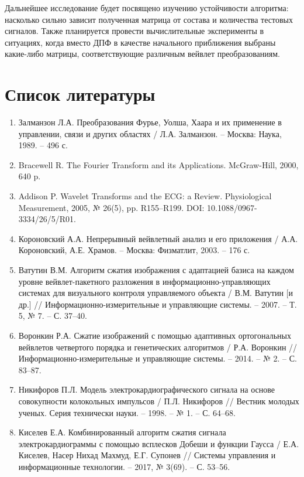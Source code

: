 \documentclass[11pt, oneside, a4paper]{article}
\begin{document}
Дальнейшее исследование будет посвящено изучению устойчивости алгоритма: насколько сильно зависит полученная матрица от состава и количества тестовых сигналов. Также планируется провести вычислительные эксперименты в ситуациях, когда вместо ДПФ в качестве начального приближения выбраны какие-либо матрицы, соответствующие различным вейвлет преобразованиям.


\section{Список литературы}

\begin{enumerate} 
\item Залманзон Л.А. Преобразования Фурье, Уолша, Хаара и их применение в управлении, связи и других областях / Л.А. Залманзон. – Москва: Наука, 1989. – 496 с.
\item Bracewell R. The Fourier Transform and its Applications. McGraw-Hill, 2000, 640 p.
\item Addison P. Wavelet Transforms and the ECG: a Review. Physiological Measurement, 2005, № 26(5), pp. R155–R199. DOI: 10.1088/0967-3334/26/5/R01.
\item Короновский А.А. Непрерывный вейвлетный анализ и его приложения / А.А. Короновский, А.Е. Храмов. – Москва: Физматлит, 2003. – 176 с.
\item Ватутин В.М. Алгоритм сжатия изображения с адаптацией базиса на каждом уровне вейвлет-пакетного разложения в информационно-управляющих системах для визуального контроля управляемого объекта / В.М. Ватутин [и др.] // Информационно-измерительные и управляющие системы. – 2007. – Т. 5, № 7. – С. 37–40.
\item Воронкин Р.А. Сжатие изображений с помощью адаптивных ортогональных вейвлетов четвертого порядка и генетических алгоритмов / Р.А. Воронкин // Информационно-измерительные и управляющие системы. – 2014. – № 2. – С. 83–87.
\item Никифоров П.Л. Модель электрокардиографического сигнала на основе совокупности колокольных импульсов / П.Л. Никифоров // Вестник молодых ученых. Серия технически науки. – 1998. – № 1. – С. 64–68.
\item Киселев Е.А. Комбинированный алгоритм сжатия сигнала электрокардиограммы с помощью всплесков Добеши и функции Гаусса / Е.А. Киселев, Насер Нихад Махмуд, Е.Г. Супонев // Системы управления и информационные технологии. – 2017, № 3(69). – С. 53–56.

\end{enumerate}
\end{document}
